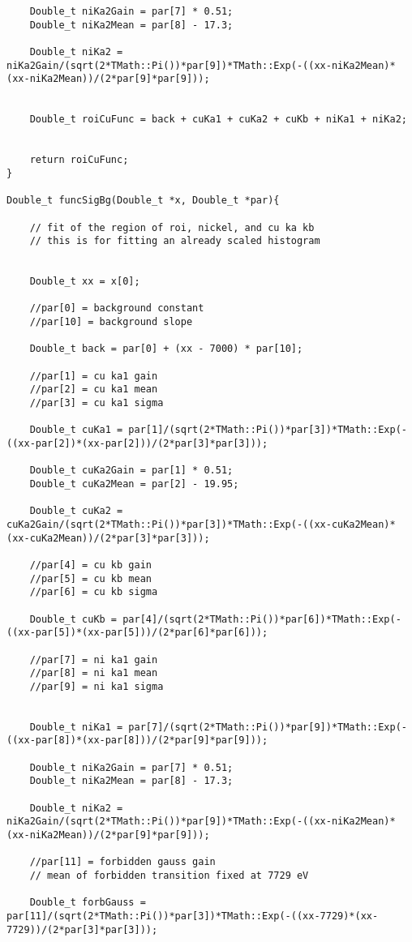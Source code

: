 \begin{appendices}
\begin{lstlisting}
    Double_t niKa2Gain = par[7] * 0.51;
    Double_t niKa2Mean = par[8] - 17.3;
    
    Double_t niKa2 = niKa2Gain/(sqrt(2*TMath::Pi())*par[9])*TMath::Exp(-((xx-niKa2Mean)*(xx-niKa2Mean))/(2*par[9]*par[9]));

    
    Double_t roiCuFunc = back + cuKa1 + cuKa2 + cuKb + niKa1 + niKa2;
    
   
    return roiCuFunc;    
}

Double_t funcSigBg(Double_t *x, Double_t *par){
    
    // fit of the region of roi, nickel, and cu ka kb
    // this is for fitting an already scaled histogram
    
    
    Double_t xx = x[0];
    
    //par[0] = background constant
    //par[10] = background slope
    
    Double_t back = par[0] + (xx - 7000) * par[10];
    
    //par[1] = cu ka1 gain
    //par[2] = cu ka1 mean
    //par[3] = cu ka1 sigma
    
    Double_t cuKa1 = par[1]/(sqrt(2*TMath::Pi())*par[3])*TMath::Exp(-((xx-par[2])*(xx-par[2]))/(2*par[3]*par[3]));
    
    Double_t cuKa2Gain = par[1] * 0.51;
    Double_t cuKa2Mean = par[2] - 19.95;
    
    Double_t cuKa2 = cuKa2Gain/(sqrt(2*TMath::Pi())*par[3])*TMath::Exp(-((xx-cuKa2Mean)*(xx-cuKa2Mean))/(2*par[3]*par[3]));
    
    //par[4] = cu kb gain
    //par[5] = cu kb mean
    //par[6] = cu kb sigma
    
    Double_t cuKb = par[4]/(sqrt(2*TMath::Pi())*par[6])*TMath::Exp(-((xx-par[5])*(xx-par[5]))/(2*par[6]*par[6]));
    
    //par[7] = ni ka1 gain
    //par[8] = ni ka1 mean
    //par[9] = ni ka1 sigma
  
    
    Double_t niKa1 = par[7]/(sqrt(2*TMath::Pi())*par[9])*TMath::Exp(-((xx-par[8])*(xx-par[8]))/(2*par[9]*par[9]));
    
    Double_t niKa2Gain = par[7] * 0.51;
    Double_t niKa2Mean = par[8] - 17.3;
    
    Double_t niKa2 = niKa2Gain/(sqrt(2*TMath::Pi())*par[9])*TMath::Exp(-((xx-niKa2Mean)*(xx-niKa2Mean))/(2*par[9]*par[9]));

    //par[11] = forbidden gauss gain
    // mean of forbidden transition fixed at 7729 eV
    
    Double_t forbGauss = par[11]/(sqrt(2*TMath::Pi())*par[3])*TMath::Exp(-((xx-7729)*(xx-7729))/(2*par[3]*par[3]));
 

\end{lstlisting}
\end{appendices}
